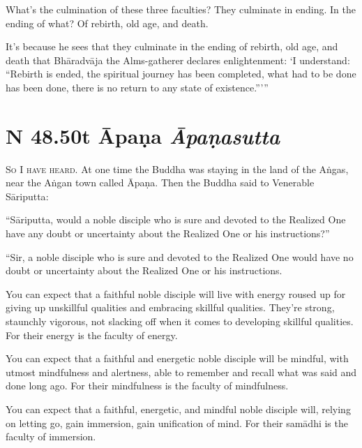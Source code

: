 \documentclass[12pt,openany]{book}%
\newcommand*{\suttatitleacronym}[1]{\smaller[2]{#1}\vspace*{.3em}}
\newcommand*{\suttatitletranslation}[1]{\linebreak{#1}}
\newcommand*{\suttatitleroot}[1]{\linebreak\smaller[2]\itshape{#1}}
\newcommand*{\tocacronym}[1]{\hspace*{-3.3em}{#1}\quad}
\newcommand*{\toctranslation}[1]{#1}
\newcommand*{\tocroot}[1]{(\textit{#1})}
\newcommand*{\scevam}[1]{\textsc{#1}}
\begin{document}
What’s the culmination of these three faculties? They culminate in ending. In the ending of what? Of rebirth, old age, and death. 

It’s because he sees that they culminate in the ending of rebirth, old age, and death that \textsanskrit{Bhāradvāja} the Alms-gatherer declares enlightenment: ‘I understand: “Rebirth is ended, the spiritual journey has been completed, what had to be done has been done, there is no return to any state of existence.”’” 

%
\section*{{\suttatitleacronym SN 48.50}{\suttatitletranslation At Āpaṇa }{\suttatitleroot Āpaṇasutta}}
\addcontentsline{toc}{section}{\tocacronym{SN 48.50} \toctranslation{At Āpaṇa } \tocroot{Āpaṇasutta}}

\scevam{So I have heard. }At one time the Buddha was staying in the land of the \textsanskrit{Aṅgas}, near the \textsanskrit{Aṅgan} town called \textsanskrit{Āpaṇa}. Then the Buddha said to Venerable \textsanskrit{Sāriputta}: 

“\textsanskrit{Sāriputta}, would a noble disciple who is sure and devoted to the Realized One have any doubt or uncertainty about the Realized One or his instructions?” 

“Sir, a noble disciple who is sure and devoted to the Realized One would have no doubt or uncertainty about the Realized One or his instructions. 

You can expect that a faithful noble disciple will live with energy roused up for giving up unskillful qualities and embracing skillful qualities. They’re strong, staunchly vigorous, not slacking off when it comes to developing skillful qualities. For their energy is the faculty of energy. 

You can expect that a faithful and energetic noble disciple will be mindful, with utmost mindfulness and alertness, able to remember and recall what was said and done long ago. For their mindfulness is the faculty of mindfulness. 

You can expect that a faithful, energetic, and mindful noble disciple will, relying on letting go, gain immersion, gain unification of mind. For their \textsanskrit{samādhi} is the faculty of immersion. 
\end{document}
